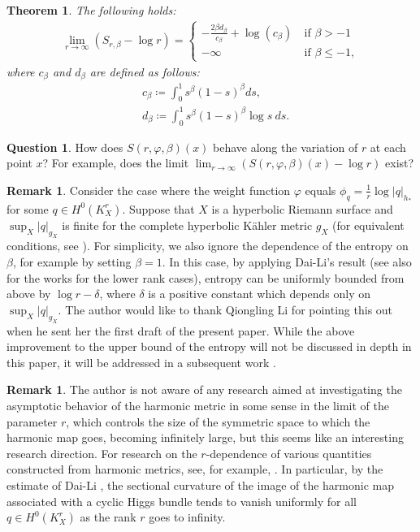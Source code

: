 \documentclass[12pt]{article}
\theoremstyle{definition}
\newtheorem{theo}[defi]{Theorem}
\newtheorem{rem}[defi]{Remark}
\newtheorem{que}[defi]{Question}
\def\refe{\ast}
\begin{document}
\begin{theo}\label{main theorem b} {\it The following holds:
\begin{align*}
\lim_{r\to\infty} (S_{r,\beta}-\log r)=
\begin{cases}
-\frac{2\beta d_\beta}{c_\beta}+\log(c_\beta) \ &\text{if $\beta>-1$} \\
-\infty \ &\text{if $\beta\leq -1$},
\end{cases}
\end{align*}
where $c_\beta$ and $d_\beta$ are defined as follows:
\begin{align*}
&c_\beta\coloneqq \int_0^1s^\beta(1-s)^\beta ds, \\
&d_\beta\coloneqq \int_0^1s^\beta(1-s)^\beta \log s\ ds.
\end{align*}
}
\end{theo}
\begin{que}How does $S(r,\varphi,\beta)(x)$ behave along the variation of $r$ at each point $x$? For example, does the limit $\lim_{r\to\infty}(S(r,\varphi,\beta)(x)-\log r)$ exist?
\end{que}
\begin{rem} Consider the case where the weight function $\varphi$ equals $\phi_q=\frac{1}{r}\log|q|_{h_\refe}$ for some $q\in H^0(K_X^r)$. Suppose that $X$ is a hyperbolic Riemann surface and $\sup_X|q|_{g_X}$ is finite for the complete hyperbolic K\"ahler metric $g_X$ (for equivalent conditions, see \cite[Theorem 4.8]{DL3}). 
For simplicity, we also ignore the dependence of the entropy on $\beta$, for example by setting $\beta = 1$.
In this case, by applying Dai-Li's result \cite[Theorem 4.8]{DL3} (see also \cite{BH1, LT1, Wan1} for the works for the lower rank cases), entropy can be uniformly bounded from above by $\log r-\delta$, where $\delta$ is a positive constant which depends only on $\sup_X|q|_{g_X}$. 
The author would like to thank Qiongling Li for pointing this out when he sent her the first draft of the present paper. While the above improvement to the upper bound of the entropy will not be discussed in depth in this paper, it will be addressed in a subsequent work \cite{Miy4}.\end{rem} 


\begin{rem} The author is not aware of any research aimed at investigating the asymptotic behavior of the harmonic metric in some sense in the limit of the parameter $r$, which controls the size of the symmetric space to which the harmonic map goes, becoming infinitely large, but this seems like an interesting research direction. For research on the $r$-dependence of various quantities constructed from harmonic metrics, see, for example, \cite{DL1, DL2, Li0, LM3, Ma1}. In particular, by the estimate of Dai-Li \cite[Theorem 1.5]{DL2}, the sectional curvature of the image of the harmonic map associated with a cyclic Higgs bundle tends to vanish uniformly for all $q \in H^0(K_X^r)$ as the rank $r$ goes to infinity. 
\end{rem}
\end{document}

